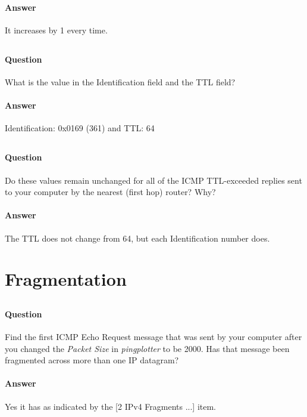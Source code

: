 \documentclass[12pt,letterpaper]{article}
\begin{document}
\paragraph{Answer} It increases by 1 every time.

\subsection{}
\paragraph{Question} What is the value in the Identification field and the TTL
field?
\paragraph{Answer} Identification: 0x0169 (361) and TTL: 64



\label{9}
\subsection{}
\paragraph{Question} Do these values remain unchanged for all of the ICMP
TTL-exceeded replies sent to your computer by the nearest (first hop) router?
Why?
\paragraph{Answer} The TTL does not change from 64, but each Identification
number does.

\section*{Fragmentation}
\subsection{}
\paragraph{Question}
Find the first ICMP Echo Request message that was sent by your computer after
you changed the \emph{Packet Size} in \emph{pingplotter} to be 2000. Has that message been
fragmented across more than one IP datagram?
\paragraph{Answer} Yes it has as indicated by the [2 IPv4 Fragments ...] item.
\end{document}
